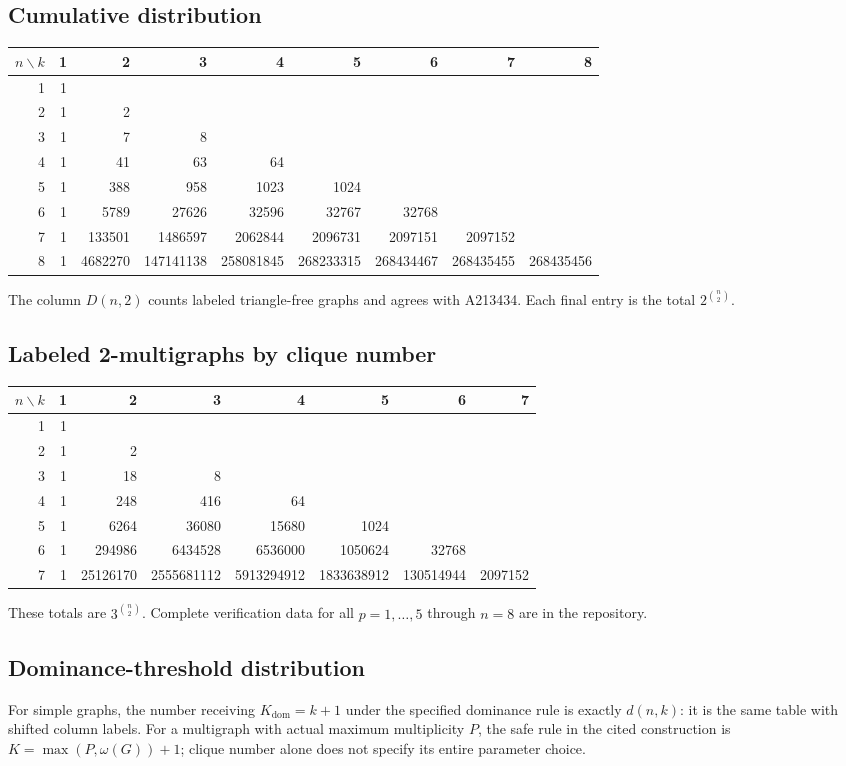 \documentclass[11pt,a4paper]{article}
\theoremstyle{definition}
\newcommand{\Kdom}{K_{\mathrm{dom}}}
\begin{document}
\subsection{Cumulative distribution}
\begin{center}\scriptsize\setlength{\tabcolsep}{3pt}
\begin{tabular}{r|rrrrrrrr}\toprule
$n\backslash k$&1&2&3&4&5&6&7&8\\\midrule
1&1\\2&1&2\\3&1&7&8\\4&1&41&63&64\\
5&1&388&958&1023&1024\\
6&1&5789&27626&32596&32767&32768\\
7&1&133501&1486597&2062844&2096731&2097151&2097152\\
8&1&4682270&147141138&258081845&268233315&268434467&268435455&268435456\\\bottomrule
\end{tabular}\end{center}
The column $D(n,2)$ counts labeled triangle-free graphs and agrees
with A213434. Each final entry is the total $2^{\binom n2}$.

\subsection{Labeled 2-multigraphs by clique number}
\begin{center}\scriptsize\setlength{\tabcolsep}{3pt}
\begin{tabular}{r|rrrrrrr}\toprule
$n\backslash k$&1&2&3&4&5&6&7\\\midrule
1&1\\2&1&2\\3&1&18&8\\4&1&248&416&64\\
5&1&6264&36080&15680&1024\\
6&1&294986&6434528&6536000&1050624&32768\\
7&1&25126170&2555681112&5913294912&1833638912&130514944&2097152\\\bottomrule
\end{tabular}\end{center}
These totals are $3^{\binom n2}$. Complete verification data for all
$p=1,\ldots,5$ through $n=8$ are in the repository.

\subsection{Dominance-threshold distribution}
For simple graphs, the number receiving $\Kdom=k+1$ under the
specified dominance rule is exactly $d(n,k)$: it is the same table
with shifted column labels. For a multigraph with actual maximum
multiplicity $P$, the safe rule in the cited construction is
$K=\max(P,\omega(G))+1$; clique number alone does not specify its
entire parameter choice.
\end{document}
